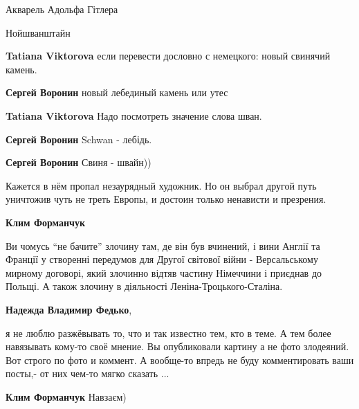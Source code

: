  
 
 
 
 


Акварель Адольфа Гітлера

Нойшванштайн

\textbf{Tatiana Viktorova} если перевести дословно с немецкого: новый свинячий камень.

\textbf{Сергей Воронин} новый лебединый камень или утес


\textbf{Tatiana Viktorova} Надо посмотреть значение слова шван.

\textbf{Сергей Воронин} Schwan - лебідь.

\textbf{Сергей Воронин} Свиня - швайн))


Кажется в нём пропал незаурядный художник. Но он выбрал другой путь уничтожив
чуть не треть Европы, и достоин только ненависти и презрения.

\textbf{Клим Форманчук} 

Ви чомусь \enquote{не бачите} злочину там, де він був вчинений, і вини Англії та
Франції у створенні передумов для Другої світової війни - Версальському мирному
договорі, який злочинно відтяв частину Німеччини і приєднав до Польщі. А також
злочину в діяльності Леніна-Троцького-Сталіна.

\textbf{Надежда Владимир Федько}, 

я не люблю разжёвывать то, что и так известно тем, кто в теме. А тем более
навязывать кому-то своё мнение. Вы опубликовали картину а не фото злодеяний.
Вот строго по фото и коммент. А вообще-то впредь не буду комментировать ваши
посты,- от них чем-то мягко сказать ...

\textbf{Клим Форманчук} Навзаєм)

